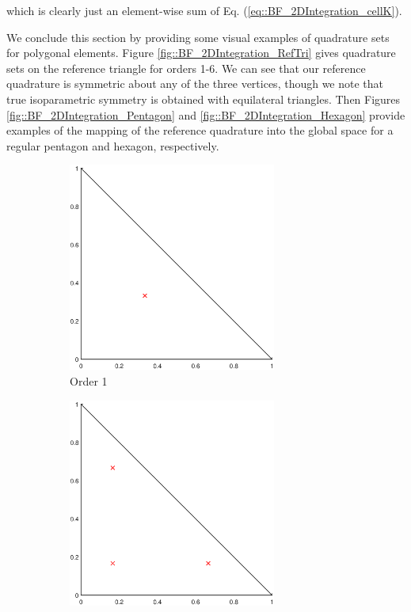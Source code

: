 \noindent which is clearly just an element-wise sum of Eq. (\ref{eq::BF_2DIntegration_cellK}).

We conclude this section by providing some visual examples of quadrature sets for polygonal elements. Figure \ref{fig::BF_2DIntegration_RefTri} gives quadrature sets on the reference triangle for orders 1-6. We can see that our reference quadrature is symmetric about any of the three vertices, though we note that true isoparametric symmetry is obtained with equilateral triangles. Then Figures \ref{fig::BF_2DIntegration_Pentagon} and \ref{fig::BF_2DIntegration_Hexagon} provide examples of the mapping of the reference quadrature into the global space for a regular pentagon and hexagon, respectively. 

\begin{figure}
\centering
{
	\begin{subfigure}[b]{0.475\textwidth}
		\centering
		\label{subfig::2DInt_RefTri_Q1}
		\includegraphics[width=0.75\textwidth]{figures/sec_BF/RefTriQuad_Q1.eps}
		\caption{Order 1}
	\end{subfigure}
	\hfill
	\begin{subfigure}[b]{0.475\textwidth}
		\centering
		\label{subfig::2DInt_RefTri_Q2}
		\includegraphics[width=0.75\textwidth]{figures/sec_BF/RefTriQuad_Q2.eps}

\end{subfigure}}
\end{figure}
